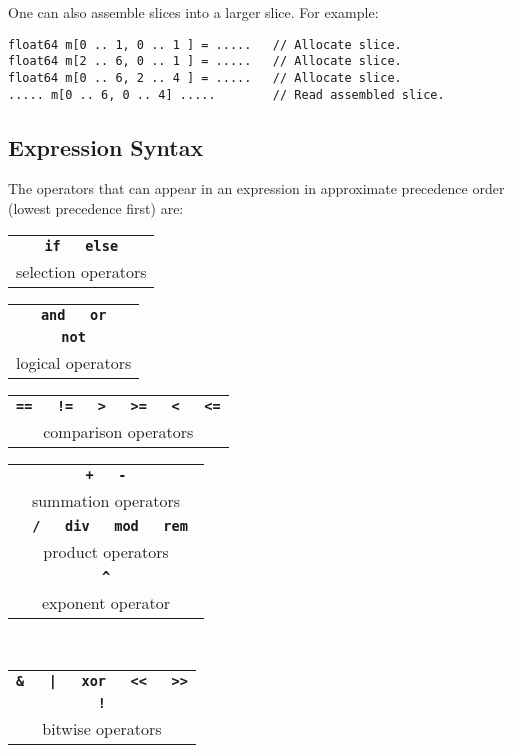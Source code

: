 \documentclass[12pt]{article}
\newcommand{\TT}[1]{{\tt \bfseries #1}}
\newenvironment{indpar}[1][0.3in]%
	{\begin{list}{}%
		     {\setlength{\itemsep}{0in}%
		      \setlength{\topsep}{0in}%
		      \setlength{\parsep}{1ex}%
		      \setlength{\labelwidth}{#1}%
		      \setlength{\leftmargin}{#1}%
		      \addtolength{\leftmargin}{\labelsep}}%
	 \item}%
	{\end{list}}
\begin{document}
One can also assemble slices into a larger slice.  For example:
\begin{indpar}\begin{verbatim}
float64 m[0 .. 1, 0 .. 1 ] = .....   // Allocate slice.
float64 m[2 .. 6, 0 .. 1 ] = .....   // Allocate slice.
float64 m[0 .. 6, 2 .. 4 ] = .....   // Allocate slice.
..... m[0 .. 6, 0 .. 4] .....        // Read assembled slice.
\end{verbatim}\end{indpar}

\subsection{Expression Syntax}

The operators that can appear in an expression in approximate
precedence order (lowest precedence first) are:

\begin{center}

\begin{tabular}{c}
\TT{if ~ else} \\
selection operators
\end{tabular}

\medskip

\begin{tabular}{c}
\TT{and ~ or} \\
\TT{not} \\
logical operators
\end{tabular}

\medskip

\begin{tabular}{c}
\TT{== ~ != ~ > ~ >= ~ < ~ <=} \\
comparison operators
\end{tabular}

\medskip

\begin{tabular}[t]{c}
\TT{+ ~ -} \\
summation operators
\\[2ex]
\TT{* ~ / ~ div ~ mod ~ rem } \\
product operators
\\[2ex]
\TT{\textasciicircum} \\
exponent operator
\end{tabular}
~~~~~
\begin{tabular}[t]{c}
\TT{\& ~ | ~ xor ~ <{}< ~ >{}>} \\
\TT{!} \\
bitwise operators
\end{tabular}

\end{center}
\end{document}
